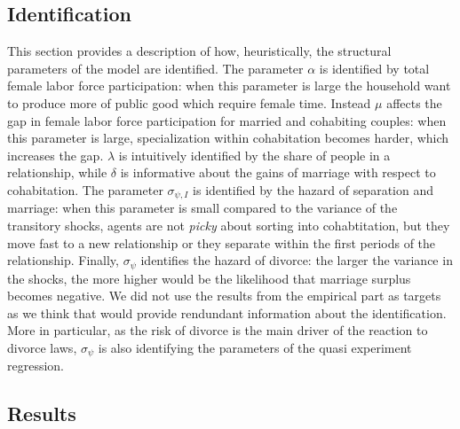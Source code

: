 \documentclass[12pt]{article}
\numberwithin{table}{section}
\begin{document}
\subsection{Identification}
This section provides a description of how, heuristically, the structural parameters of the model are identified. The parameter $\alpha$ is identified by total female labor force participation: when this parameter is large the household want to produce more of public good which require female time. Instead $\mu$ affects the gap in female labor force participation for married and cohabiting couples: when this parameter is large, specialization within cohabitation becomes harder, which increases the gap. $\lambda$ is intuitively identified by the share of people in a relationship, while $\delta$ is informative about the gains of marriage with respect to cohabitation. The parameter $\sigma_{\psi,I}$ is identified by the hazard of separation and marriage: when this parameter is small compared to the variance of the transitory shocks, agents are not \textit{picky} about sorting into cohabtitation, but they move fast to a new relationship or they separate within the first periods of the relationship. Finally, $\sigma_{\psi}$ identifies the hazard of divorce: the larger the variance in the shocks, the more higher would be the likelihood that marriage surplus becomes negative. We did not use the results from the empirical part as targets as we think that would provide rendundant information about the identification. More in particular, as the risk of divorce is the main driver of the reaction to divorce laws, $\sigma_{\psi}$  is also identifying the parameters of the quasi experiment regression.
\subsection{Results}
\end{document}
